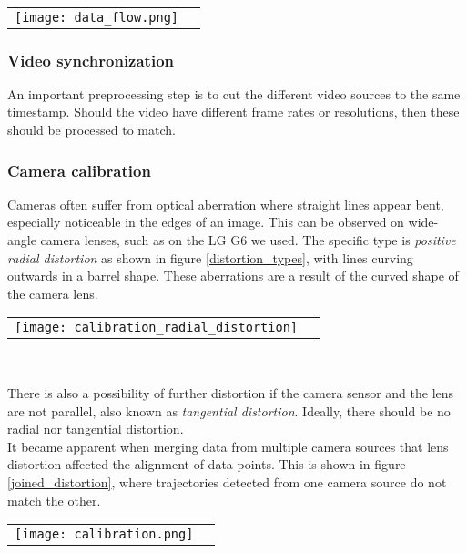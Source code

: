 \ \\

\color{red}
\raggedbottom
\begin{tabular}{@{}cc}
\texttt{[image: data\_flow.png]} 
\end{tabular}
\label{data}
\raggedbottom
\color{black}

\subsubsection{Video synchronization}
An important preprocessing step is to cut the different video sources to the same timestamp.
Should the video have different frame rates or resolutions, then these should be processed to match.

\subsubsection{Camera calibration}
Cameras often suffer from optical aberration where straight lines appear bent, especially noticeable in the edges of an image. 
This can be observed on wide-angle camera lenses, such as on the LG G6 we used.
The specific type is \textit{positive radial distortion} as shown in figure \ref{distortion_types}, with lines curving outwards in a barrel shape.
These aberrations are a result of the curved shape of the camera lens.
\ \\ 

\raggedbottom
\begin{tabular}{@{}cc}
\texttt{[image: calibration\_radial\_distortion]} 
\end{tabular}
\label{distortion_types}
\

There is also a possibility of further distortion if the camera sensor and the lens are not parallel, also known as \textit{tangential distortion}.
Ideally, there should be no radial nor tangential distortion.
\ \\
It became apparent when merging data from multiple camera sources that lens distortion affected the alignment of data points.
This is shown in figure \ref{joined_distortion}, where trajectories detected from one camera source do not match the other.

\raggedbottom
\begin{tabular}{@{}cc}
\texttt{[image: calibration.png]}
\end{tabular}
\label{joined_distortion}
\

